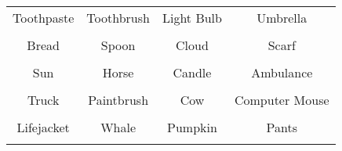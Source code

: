 \documentclass[12pt,a4paper]{article}
\begin{document}
\thispagestyle{empty}
\begin{table}[]
\centering
\Huge
\begin{tabular}{cccc}
 Toothpaste& Toothbrush& Light Bulb& Umbrella\\  & & & \\
 Bread& Spoon& Cloud& Scarf\\  & & & \\
 Sun& Horse& Candle& Ambulance\\  & & & \\
 Truck& Paintbrush& Cow& Computer Mouse\\  & & & \\
 Lifejacket& Whale& Pumpkin& Pants\\  & & & \\
\end{tabular}
\end{table}
\end{document}

